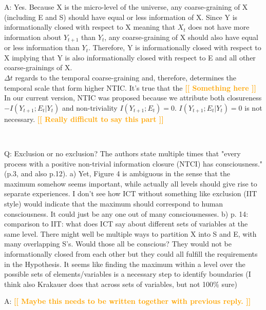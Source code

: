 \documentclass[utf8]{article}
\newcounter{cQuestion}[section]
\newenvironment{question}
    {\refstepcounter{cQuestion}\color{Blue}\noindent\newline Q\thecQuestion:}
    {~\newline}
\newenvironment{ans}  
    {\color{Black}\noindent A:}
    {~\newline}
\newcommand{\toWrite}[1]{\noindent
	\textcolor{Orange}{\textbf{[[ #1 ]]}}}
\begin{document}
        \begin{ans}
            Yes. Because X is the micro-level of the universe, any coarse-graining of X (including E and S) should have equal or less information of X. Since Y is informationally closed with respect to X meaning that $X_t$ does not have more information about $Y_{t+1}$ than $Y_t$, any coarse-graining of X should also have equal or less information than $Y_t$. Therefore, Y is informationally closed with respect to X implying that Y is also informationally closed with respect to E and all other coarse-grainings of X.\\
            $\Delta t$ regards to the temporal coarse-graining and, therefore, determines the temporal scale that form higher NTIC. It's true that the 
            \toWrite{Something here}\\
			In our current version, NTIC was proposed because we attribute both closureness $-I(Y_{t+1}; E_t|Y_t)$ and non-triviality $I(Y_{t+1}; E_t) = 0$. 
			$I(Y_{t+1}; E_t|Y_t) = 0$ is not necessary. 
			\toWrite{Really difficult to say this part}
            
           
        \end{ans}
        
        
        \begin{question}
            Exclusion or no exclusion? The authors state multiple times that "every process with a positive non-trivial information closure (NTCI) has consciousness." (p.3, and also p.12).
            a) Yet, Figure 4 is ambiguous in the sense that the maximum somehow seems important, while actually all levels should give rise to separate experiences. I don't see how ICT without something like exclusion (IIT style) would indicate that the maximum should correspond to human consciousness. It could just be any one out of many consciousnesses.
            b) p. 14: comparison to IIT: what does ICT say about different sets of variables at the same level. There might well be multiple ways to partition X into S and E, with many overlapping S's. Would those all be conscious? They would not be informationally closed from each other but they could all fulfill the requirements in the Hypothesis. It seems like finding the maximum within a level over the possible sets of elements/variables is a necessary step to identify boundaries (I think also Krakauer does that across sets of variables, but not 100\% sure)        
        \end{question}
    
    	\begin{ans}
    		\toWrite{Maybe this needs to be written together with previous reply.}
    	\end{ans}
\end{document}
